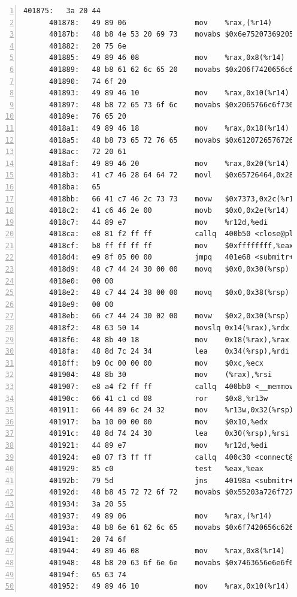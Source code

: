 \documentclass{article}
\begin{document}
\begin{lstlisting}[title = bomb的反汇编代码及部分注释, xleftmargin = 2em,xrightmargin = 2em, aboveskip = 1em, numbers = left, basicstyle=\scriptsize\ttfamily, numberstyle=\scriptsize]
      401875:	3a 20 44 
      401878:	49 89 06             	mov    %rax,(%r14)
      40187b:	48 b8 4e 53 20 69 73 	movabs $0x6e7520736920534e,%rax
      401882:	20 75 6e 
      401885:	49 89 46 08          	mov    %rax,0x8(%r14)
      401889:	48 b8 61 62 6c 65 20 	movabs $0x206f7420656c6261,%rax
      401890:	74 6f 20 
      401893:	49 89 46 10          	mov    %rax,0x10(%r14)
      401897:	48 b8 72 65 73 6f 6c 	movabs $0x2065766c6f736572,%rax
      40189e:	76 65 20 
      4018a1:	49 89 46 18          	mov    %rax,0x18(%r14)
      4018a5:	48 b8 73 65 72 76 65 	movabs $0x6120726576726573,%rax
      4018ac:	72 20 61 
      4018af:	49 89 46 20          	mov    %rax,0x20(%r14)
      4018b3:	41 c7 46 28 64 64 72 	movl   $0x65726464,0x28(%r14)
      4018ba:	65 
      4018bb:	66 41 c7 46 2c 73 73 	movw   $0x7373,0x2c(%r14)
      4018c2:	41 c6 46 2e 00       	movb   $0x0,0x2e(%r14)
      4018c7:	44 89 e7             	mov    %r12d,%edi
      4018ca:	e8 81 f2 ff ff       	callq  400b50 <close@plt>
      4018cf:	b8 ff ff ff ff       	mov    $0xffffffff,%eax
      4018d4:	e9 8f 05 00 00       	jmpq   401e68 <submitr+0x6bc>
      4018d9:	48 c7 44 24 30 00 00 	movq   $0x0,0x30(%rsp)
      4018e0:	00 00 
      4018e2:	48 c7 44 24 38 00 00 	movq   $0x0,0x38(%rsp)
      4018e9:	00 00 
      4018eb:	66 c7 44 24 30 02 00 	movw   $0x2,0x30(%rsp)
      4018f2:	48 63 50 14          	movslq 0x14(%rax),%rdx
      4018f6:	48 8b 40 18          	mov    0x18(%rax),%rax
      4018fa:	48 8d 7c 24 34       	lea    0x34(%rsp),%rdi
      4018ff:	b9 0c 00 00 00       	mov    $0xc,%ecx
      401904:	48 8b 30             	mov    (%rax),%rsi
      401907:	e8 a4 f2 ff ff       	callq  400bb0 <__memmove_chk@plt>
      40190c:	66 41 c1 cd 08       	ror    $0x8,%r13w
      401911:	66 44 89 6c 24 32    	mov    %r13w,0x32(%rsp)
      401917:	ba 10 00 00 00       	mov    $0x10,%edx
      40191c:	48 8d 74 24 30       	lea    0x30(%rsp),%rsi
      401921:	44 89 e7             	mov    %r12d,%edi
      401924:	e8 07 f3 ff ff       	callq  400c30 <connect@plt>
      401929:	85 c0                	test   %eax,%eax
      40192b:	79 5d                	jns    40198a <submitr+0x1de>
      40192d:	48 b8 45 72 72 6f 72 	movabs $0x55203a726f727245,%rax
      401934:	3a 20 55 
      401937:	49 89 06             	mov    %rax,(%r14)
      40193a:	48 b8 6e 61 62 6c 65 	movabs $0x6f7420656c62616e,%rax
      401941:	20 74 6f 
      401944:	49 89 46 08          	mov    %rax,0x8(%r14)
      401948:	48 b8 20 63 6f 6e 6e 	movabs $0x7463656e6e6f6320,%rax
      40194f:	65 63 74 
      401952:	49 89 46 10          	mov    %rax,0x10(%r14)

\end{lstlisting}
\end{document}
